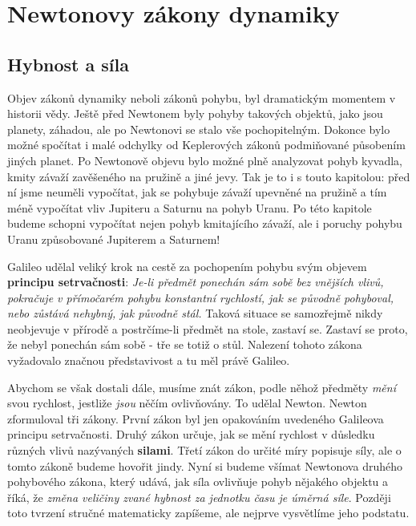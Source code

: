 \setchaptertoc
\chapter{Newtonovy zákony dynamiky}\label{fyz:IchapIX}

  \section{Hybnost a síla}\label{fyz:IchapIXsecI}
    Objev zákonů dynamiky neboli zákonů pohybu, byl dramatickým momentem v historii vědy. Ještě 
    před Newtonem byly pohyby takových objektů, jako jsou planety, záhadou, ale po Newtonovi se 
    stalo vše pochopitelným. Dokonce bylo možné spočítat i malé odchylky od Keplerových zákonů 
    podmiňované působením jiných planet. Po Newtonově objevu bylo možné plně analyzovat pohyb 
    kyvadla, kmity závaží zavěšeného na pružině a jiné jevy. Tak je to i s touto kapitolou: před ní 
    jsme neuměli vypočítat, jak se pohybuje závaží upevněné na pružině a tím méně vypočítat vliv 
    Jupiteru a Saturnu na pohyb Uranu. Po této kapitole budeme schopni vypočítat nejen pohyb 
    kmitajícího závaží, ale i poruchy pohybu Uranu způsobované Jupiterem a Saturnem!
    
    Galileo udělal veliký krok na cestě za pochopením pohybu svým objevem \textbf{principu 
    setrvačnosti}: \emph{Je-li předmět ponechán sám sobě bez vnějších vlivů, pokračuje v přímočarém 
    pohybu konstantní rychlostí, jak se původně pohyboval, nebo zůstává nehybný, jak původně stál.} 
    Taková situace se samozřejmě nikdy neobjevuje v přírodě a postrčíme-li předmět na stole, 
    zastaví se. Zastaví se proto, že nebyl ponechán sám sobě - tře se totiž o stůl. Nalezení tohoto 
    zákona vyžadovalo značnou představivost a tu měl právě Galileo.
    
    Abychom se však dostali dále, musíme znát zákon, podle něhož předměty \emph{mění} svou 
    rychlost, jestliže \emph{jsou} něčím ovlivňovány. To udělal Newton. Newton zformuloval tři 
    zákony. První zákon byl jen opakováním uvedeného Galileova principu setrvačnosti. Druhý zákon 
    určuje, jak se mění rychlost v důsledku různých vlivů nazývaných \textbf{silami}. Třetí zákon 
    do určité míry popisuje síly, ale o tomto zákoně budeme hovořit jindy. Nyní si budeme všímat 
    Newtonova druhého pohybového zákona, který udává, jak síla ovlivňuje pohyb nějakého objektu a 
    říká, že \emph{změna veličiny zvané hybnost za jednotku času je úměrná síle}. Později toto 
    tvrzení stručné matematicky zapíšeme, ale nejprve vysvětlíme jeho podstatu.
    
